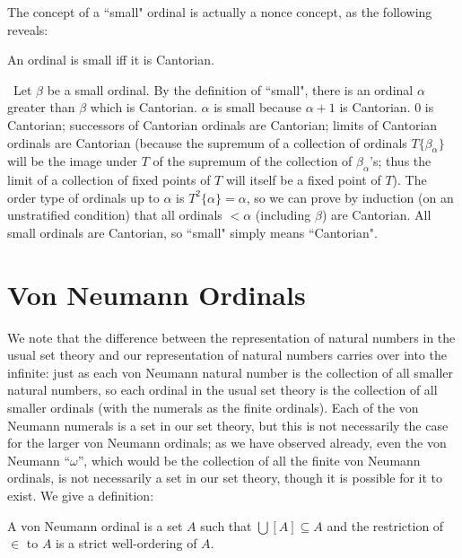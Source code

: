 The concept of a ``small" ordinal is actually a nonce concept,
as the following reveals:

\begin{thm}
 An ordinal is small iff it is Cantorian.
\end{thm}

\preuve\ Let $\beta$ be a small ordinal.
By the definition of ``small", there is an ordinal $\alpha$ greater
than $\beta$ which is Cantorian.  $\alpha$ is small because $\alpha
+1$ is Cantorian.  0 is Cantorian; successors of
Cantorian ordinals are Cantorian; limits of Cantorian
ordinals are Cantorian (because the supremum of a collection of
ordinals $T\{\beta_{\alpha}\}$ will be the image
under $T$ of the supremum of the collection of $\beta_{\alpha}$'s; thus the
limit of a collection of fixed points of $T$ will itself be a fixed point of
$T$).
The order type of ordinals up to $\alpha$ is $T^2\{\alpha\} = \alpha$,
so we can prove by induction (on an unstratified
condition) that all ordinals $< \alpha$ (including $\beta$)  are Cantorian.
All small ordinals are  Cantorian, so ``small" simply means ``Cantorian".
\finpreuve


\section{Von Neumann Ordinals}

We note that the difference between the representation of natural numbers in the usual set theory and
our representation of natural 
numbers carries over into the infinite: just as each von Neumann natural number is the collection of all smaller natural
numbers, so each ordinal in the usual set theory is the collection of all
smaller ordinals (with the numerals as the finite
ordinals).  Each of the von Neumann numerals is a set in our set theory, but
this is not necessarily the case for the larger von Neumann ordinals; as we
have observed already, even the von Neumann ``$\omega$'', which would be
the collection of all the finite von Neumann
ordinals, is not necessarily a set in our set theory, though it is possible for
it to exist.  We give a definition:

\begin{definition}
 A {\upshape von Neumann ordinal} is a set
 $A$ such that $\bigcup[A] \subseteq A$ and the restriction of
 $\in$ 
 to $A$ is a strict well-ordering of $A$.
\end{definition}

